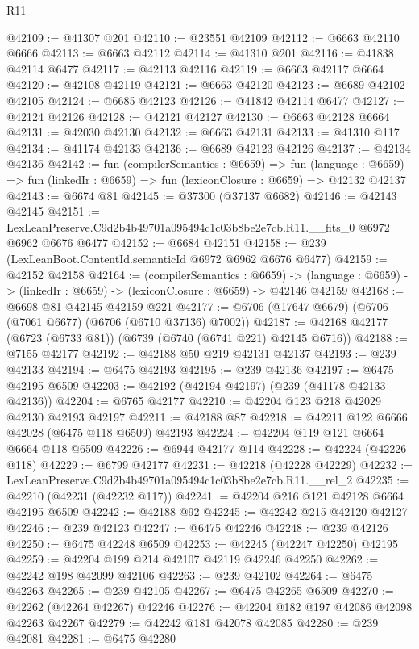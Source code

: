 \begin{lexlean}{R11}
\begin{coremodule}
@42109 := @41307 @201
@42110 := @23551 @42109
@42112 := @6663 @42110 @6666
@42113 := @6663 @42112
@42114 := @41310 @201
@42116 := @41838 @42114 @6477
@42117 := @42113 @42116
@42119 := @6663 @42117 @6664
@42120 := @42108 @42119
@42121 := @6663 @42120
@42123 := @6689 @42102 @42105
@42124 := @6685 @42123
@42126 := @41842 @42114 @6477
@42127 := @42124 @42126
@42128 := @42121 @42127
@42130 := @6663 @42128 @6664
@42131 := @42030 @42130
@42132 := @6663 @42131
@42133 := @41310 @117
@42134 := @41174 @42133
@42136 := @6689 @42123 @42126
@42137 := @42134 @42136
@42142 := fun (compilerSemantics : @6659) =>
  fun (language : @6659) => fun (linkedIr : @6659) => fun (lexiconClosure : @6659) => @42132 @42137
@42143 := @6674 @81
@42145 := @37300 (@37137 @6682)
@42146 := @42143 @42145
@42151 := LexLeanPreserve.C9d2b4b49701a095494c1c03b8be2e7cb.R11.__fits_0 @6972 @6962 @6676 @6477
@42152 := @6684 @42151
@42158 := @239 (LexLeanBoot.ContentId.semanticId @6972 @6962 @6676 @6477)
@42159 := @42152 @42158
@42164 := (compilerSemantics : @6659) ->
  (language : @6659) -> (linkedIr : @6659) -> (lexiconClosure : @6659) -> @42146 @42159
@42168 := @6698 @81 @42145 @42159 @221
@42177 := @6706 (@17647 @6679) (@6706 (@7061 @6677) (@6706 (@6710 @37136) @7002))
@42187 := @42168 @42177 (@6723 (@6733 @81)) (@6739 (@6740 (@6741 @221) @42145 @6716))
@42188 := @7155 @42177
@42192 := @42188 @50 @219 @42131 @42137
@42193 := @239 @42133
@42194 := @6475 @42193
@42195 := @239 @42136
@42197 := @6475 @42195 @6509
@42203 := @42192 (@42194 @42197) (@239 (@41178 @42133 @42136))
@42204 := @6765 @42177
@42210 := @42204 @123 @218 @42029 @42130 @42193 @42197
@42211 := @42188 @87
@42218 := @42211 @122 @6666 @42028 (@6475 @118 @6509) @42193
@42224 := @42204 @119 @121 @6664 @6664 @118 @6509
@42226 := @6944 @42177 @114
@42228 := @42224 (@42226 @118)
@42229 := @6799 @42177
@42231 := @42218 (@42228 @42229)
@42232 := LexLeanPreserve.C9d2b4b49701a095494c1c03b8be2e7cb.R11.__rel_2
@42235 := @42210 (@42231 (@42232 @117))
@42241 := @42204 @216 @121 @42128 @6664 @42195 @6509
@42242 := @42188 @92
@42245 := @42242 @215 @42120 @42127
@42246 := @239 @42123
@42247 := @6475 @42246
@42248 := @239 @42126
@42250 := @6475 @42248 @6509
@42253 := @42245 (@42247 @42250) @42195
@42259 := @42204 @199 @214 @42107 @42119 @42246 @42250
@42262 := @42242 @198 @42099 @42106
@42263 := @239 @42102
@42264 := @6475 @42263
@42265 := @239 @42105
@42267 := @6475 @42265 @6509
@42270 := @42262 (@42264 @42267) @42246
@42276 := @42204 @182 @197 @42086 @42098 @42263 @42267
@42279 := @42242 @181 @42078 @42085
@42280 := @239 @42081
@42281 := @6475 @42280

\end{coremodule}
\end{lexlean}
